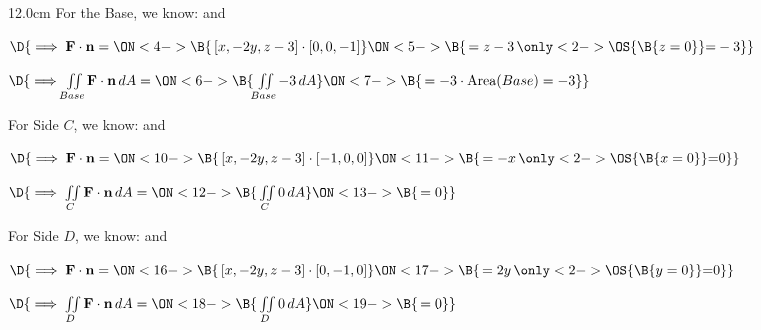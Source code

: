 \begin{frame}
\begin{columns}\begin{column}{12.0cm}
\scriptsize
For the Base, we know: \quad 
{} \quad and \quad 
{}

\vspace{0.1cm}

$\D{\implies {\bf F} \cdot {\bf n} = 
\ON<4->{\B{ \, [x,-2y,z-3] \cdot [0,0,-1]}}
\ON<5->{\B{\, = z - 3 \,\only<2->{\OS{\B{ z=0 }}}{ = } -3}}}$ 

\vspace{0.2cm}

$\D{\implies \iint \limits_{Base} {\bf F} \cdot {\bf n}\, dA = 
\ON<6->{\B{\, \iint \limits_{Base} -3 \, dA }}
\ON<7->{\B{\, = -3 \cdot \text{Area}(Base) = -3}}}$ 

\vspace{0.4cm}

For Side $C$, we know: \quad 
{} \quad and \quad 
{}

\vspace{0.1cm}

$\D{\implies {\bf F} \cdot {\bf n} = 
\ON<10->{\B{ \, [x,-2y,z-3] \cdot [-1,0,0]}}
\ON<11->{\B{\, = -x \,\only<2->{\OS{\B{ x=0 }}}{ = } 0}}}$ 

\vspace{0.2cm}

$\D{\implies \iint \limits_{C} {\bf F} \cdot {\bf n}\, dA = 
\ON<12->{\B{\, \iint \limits_{C} 0 \, dA }}
\ON<13->{\B{\, = 0}}}$

\vspace{0.4cm}

For Side $D$, we know: \quad 
{} \quad and \quad 
{}

\vspace{0.1cm}

$\D{\implies {\bf F} \cdot {\bf n} = 
\ON<16->{\B{ \, [x,-2y,z-3] \cdot [0,-1,0]}}
\ON<17->{\B{\, = 2y \,\only<2->{\OS{\B{ y=0 }}}{ = } 0}}}$ 

\vspace{0.2cm}

$\D{\implies \iint \limits_{D} {\bf F} \cdot {\bf n}\, dA = 
\ON<18->{\B{\, \iint \limits_{D} 0 \, dA }}
\ON<19->{\B{\, = 0}}}$

\vspace{0.4cm}


\end{column}
\end{columns}
\end{frame}

